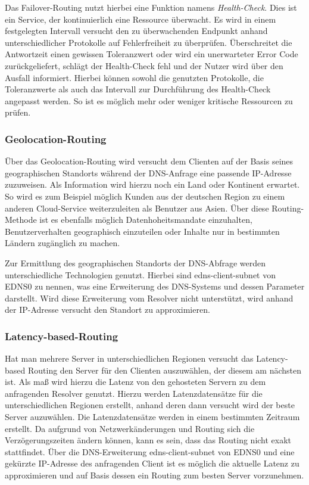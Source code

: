 Das Failover-Routing nutzt hierbei eine Funktion namens \textit{Health-Check}. Dies ist ein Service, der kontinuierlich eine Ressource überwacht. Es wird in einem festgelegten Intervall versucht den zu überwachenden Endpunkt anhand unterschiedlicher Protokolle auf Fehlerfreiheit zu überprüfen. Überschreitet die Antwortzeit einen gewissen Toleranzwert oder wird ein unerwarteter Error Code zurückgeliefert, schlägt der Health-Check fehl und der Nutzer wird über den Ausfall informiert. Hierbei können sowohl die genutzten Protokolle, die Toleranzwerte als auch das Intervall zur Durchführung des Health-Check angepasst werden. So ist es möglich mehr oder weniger kritische Ressourcen zu prüfen.

\subsubsection{Geolocation-Routing}
Über das Geolocation-Routing wird versucht dem Clienten auf der Basis seines geographischen Standorts während der DNS-Anfrage eine passende IP-Adresse zuzuweisen. Als Information wird hierzu noch ein Land oder Kontinent erwartet. So wird es zum Beispiel möglich Kunden aus der deutschen Region zu einem anderen Cloud-Service weiterzuleiten als Benutzer aus Asien. Über diese Routing-Methode ist es ebenfalls möglich Datenhoheitsmandate einzuhalten, Benutzerverhalten geographisch einzuteilen oder Inhalte nur in bestimmten Ländern zugänglich zu machen. 

Zur Ermittlung des geographischen Standorts der DNS-Abfrage werden unterschiedliche Technologien genutzt. Hierbei sind edns-client-subnet von EDNS0 zu nennen, was eine Erweiterung des DNS-Systems und dessen Parameter darstellt. Wird diese Erweiterung vom Resolver nicht unterstützt, wird anhand der IP-Adresse versucht den Standort zu approximieren.

\subsubsection{Latency-based-Routing}
Hat man mehrere Server in unterschiedlichen Regionen versucht das Latency-based Routing den Server für den Clienten auszuwählen, der diesem am nächsten ist. Als maß wird hierzu die Latenz von den gehosteten Servern zu dem anfragenden Resolver genutzt. Hierzu werden Latenzdatensätze für die unterschiedlichen Regionen erstellt, anhand deren dann versucht wird der beste Server auzuwählen. Die Latenzdatensätze werden in einem bestimmten Zeitraum erstellt. Da aufgrund von Netzwerkänderungen und Routing sich die Verzögerungszeiten ändern können, kann es sein, dass das Routing nicht exakt stattfindet. Über die DNS-Erweiterung edns-client-subnet von EDNS0 und eine gekürzte IP-Adresse des anfragenden Client ist es möglich die aktuelle Latenz zu approximieren und auf Basis dessen ein Routing zum besten Server vorzunehmen.

